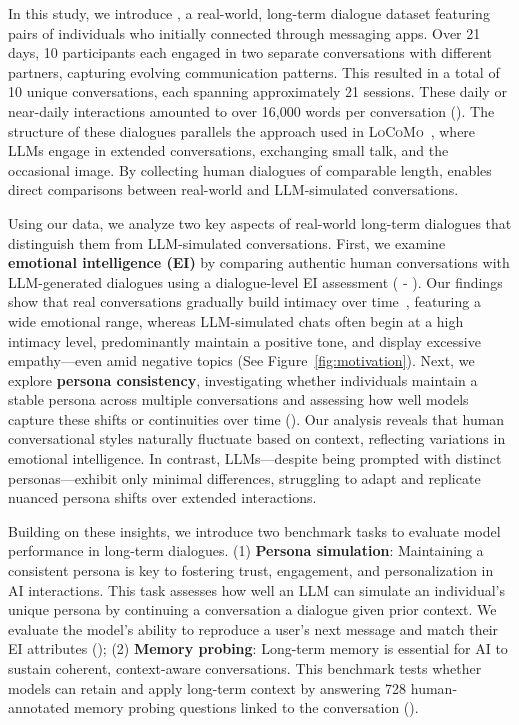 In this study, we introduce \dataset{}, a real-world, long-term dialogue dataset featuring pairs of individuals who initially connected through messaging apps.
Over 21 days, 10 participants each engaged in two separate conversations with different partners, capturing evolving communication patterns. 
This resulted in a total of 10 unique conversations, each spanning approximately 21 sessions.
These daily or near-daily interactions amounted to over 16,000 words per conversation ().
The structure of these dialogues parallels the approach used in \textsc{LoCoMo}~\cite{maharana-etal-2024-evaluating}, where LLMs engage in extended conversations, exchanging small talk, and the occasional image.
By collecting human dialogues of comparable length, \dataset{} enables direct comparisons between real-world and LLM-simulated conversations.

Using our data, we analyze two key aspects of real-world long-term dialogues that distinguish them from LLM-simulated conversations.
First, we examine \textbf{emotional intelligence (EI)} by comparing authentic human conversations with LLM-generated dialogues using a dialogue-level EI assessment ( - ). 
Our findings show that real conversations gradually build intimacy over time~\cite{altman1973social, derks2008role}, featuring a wide emotional range, whereas LLM-simulated chats often begin at a high intimacy level, predominantly maintain a positive tone, and display excessive empathy—even amid negative topics (See Figure~\ref{fig:motivation}).
Next, we explore \textbf{persona consistency}, investigating whether individuals maintain a stable persona across multiple conversations and assessing how well models capture these shifts or continuities over time (). 
Our analysis reveals that human conversational styles naturally fluctuate based on context, reflecting variations in emotional intelligence. 
In contrast, LLMs—despite being prompted with distinct personas—exhibit only minimal differences, struggling to adapt and replicate nuanced persona shifts over extended interactions.


Building on these insights, we introduce two benchmark tasks to evaluate model performance in long-term dialogues.  
(1) \textbf{Persona simulation}:
Maintaining a consistent persona is key to fostering trust, engagement, and personalization in AI interactions.  
This task assesses how well an LLM can simulate an individual’s unique persona by continuing a conversation a dialogue given prior context.
We evaluate the model’s ability to reproduce a user’s next message and match their EI attributes ();
(2) \textbf{Memory probing}:
Long-term memory is essential for AI to sustain coherent, context-aware conversations. 
This benchmark tests whether models can retain and apply long-term context by answering 728 human-annotated memory probing questions linked to the conversation ().  

